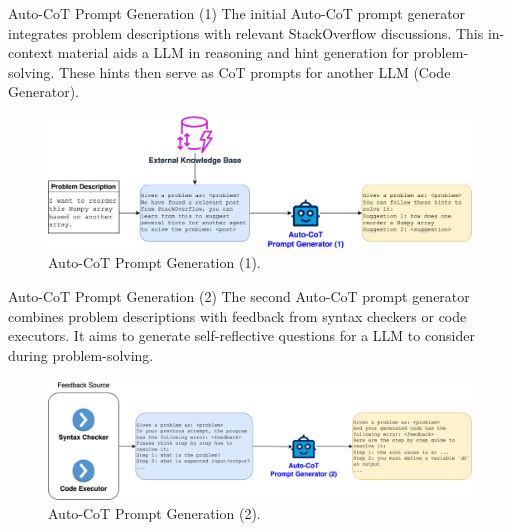 \begin{frame}{Auto-CoT Prompt Generation (1)}
    The initial Auto-CoT prompt generator integrates problem descriptions with relevant StackOverflow discussions. This in-context material aids a LLM in reasoning and hint generation for problem-solving. These hints then serve as CoT prompts for another LLM (Code Generator).
    \begin{figure}[!htb]
        \centering
        \includegraphics[width=\textwidth]{img/cot_generator_1}
        \captionsetup{font=small,labelformat=empty}
        \caption{Auto-CoT Prompt Generation (1).}
    \end{figure}
\end{frame}

\begin{frame}{Auto-CoT Prompt Generation (2)}
    The second Auto-CoT prompt generator combines problem descriptions with feedback from syntax checkers or code executors. It aims to generate self-reflective questions for a LLM to consider during problem-solving.
    \begin{figure}[!htb]
        \centering
        \includegraphics[width=\textwidth]{img/cot_generator_2}
        \captionsetup{font=small,labelformat=empty}
        \caption{Auto-CoT Prompt Generation (2).}
    \end{figure}
\end{frame}

